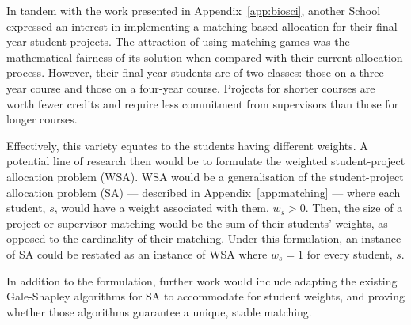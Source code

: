 In tandem with the work presented in Appendix~\ref{app:biosci}, another School
expressed an interest in implementing a matching-based allocation for their
final year student projects. The attraction of using matching games was the
mathematical fairness of its solution when compared with their current
allocation process. However, their final year students are of two classes: those
on a three-year course and those on a four-year course. Projects for shorter
courses are worth fewer credits and require less commitment from supervisors
than those for longer courses.

Effectively, this variety equates to the students having different weights. A
potential line of research then would be to formulate the weighted
student-project allocation problem (WSA). WSA would be a generalisation of the
student-project allocation problem (SA) --- described in
Appendix~\ref{app:matching} --- where each student, \(s\), would have a weight
associated with them, \(w_s > 0\). Then, the size of a project or supervisor
matching would be the sum of their students' weights, as opposed to the
cardinality of their matching. Under this formulation, an instance of SA could
be restated as an instance of WSA where \(w_s = 1\) for every student, \(s\).

In addition to the formulation, further work would include adapting the existing
Gale-Shapley algorithms for SA to accommodate for student weights, and proving
whether those algorithms guarantee a unique, stable matching.
